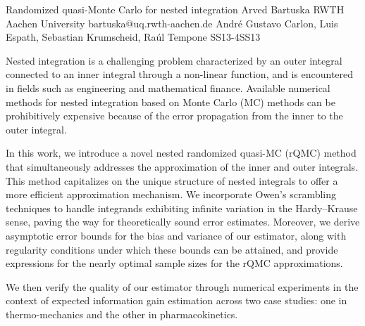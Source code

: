 \begin{talk}
  {Randomized quasi-Monte Carlo for nested integration}%
  {Arved Bartuska}%
  {RWTH Aachen University}%
  {bartuska@uq.rwth-aachen.de}%
  {Andr\'{e} Gustavo Carlon, Luis Espath, Sebastian Krumscheid, Ra\'{u}l Tempone}%
{}{}{SS13-4}{SS13}

			
Nested integration is a challenging problem characterized by an outer integral connected to an inner integral through a non-linear function, and is encountered in fields such as engineering and mathematical finance.
Available numerical methods for nested integration based on Monte Carlo (MC) methods can be prohibitively expensive because of the error propagation from the inner to the outer integral.

In this work, we introduce a novel nested randomized quasi-MC (rQMC) method that simultaneously addresses the approximation of the inner and outer integrals. This method capitalizes on the unique structure of nested integrals to offer a more efficient approximation mechanism. We incorporate Owen's scrambling techniques to handle integrands exhibiting infinite variation in the Hardy--Krause sense, paving the way for theoretically sound error estimates. Moreover, we derive asymptotic error bounds for the bias and variance of our estimator, along with regularity conditions under which these bounds can be attained, and provide expressions for the nearly optimal sample sizes for the rQMC approximations.

We then verify the quality of our estimator through numerical experiments in the context of expected information gain estimation across two case studies: one in thermo-mechanics and the other in pharmacokinetics.
\end{talk}

